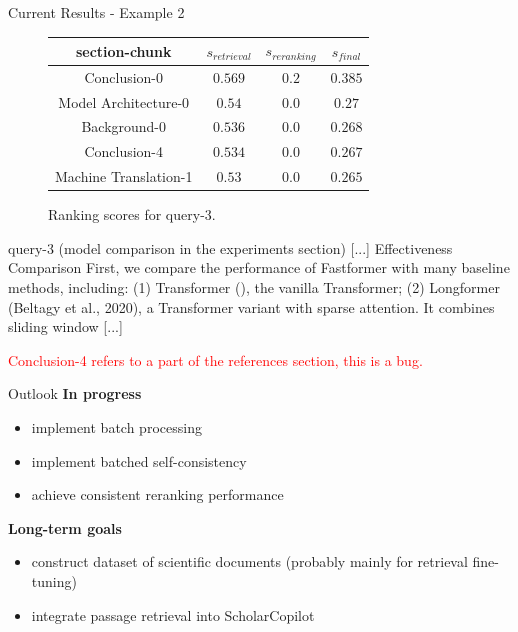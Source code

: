 \begin{frame}{Current Results - Example 2}
    \begin{figure}
        \centering
        \begin{tabular}{|c|c|c|c|}
            \hline 
            section-chunk & $s_{retrieval}$ & $s_{reranking}$ & $s_{final}$ \\
            \hline 
            Conclusion-0 & $0.569$ & $0.2$ & $0.385$ \\
            \hline 
            Model Architecture-0 & $0.54$ & $0.0$ & $0.27$ \\
            \hline 
            Background-0 & $0.536$ & $0.0$ & $0.268$ \\
            \hline 
            Conclusion-4 & $0.534$ & $0.0$ & $0.267$ \\
            \hline 
            Machine Translation-1 & $0.53$ & $0.0$ & $0.265$ \\
            \hline 
        \end{tabular}
        \caption{Ranking scores for query-3.}
    \end{figure}
    \begin{block}{query-3 (model comparison in the experiments section)}
        \small
        [...] Effectiveness Comparison First, we compare the performance of Fastformer with many baseline methods, including: (1) Transformer (), the vanilla Transformer; (2) Longformer (Beltagy et al., 2020), a Transformer variant with sparse attention. It combines sliding window [...]
    \end{block}
    \textcolor{red}{Conclusion-4 refers to a part of the references section, this is a bug.}
\end{frame}

\begin{frame}{Outlook}
    \textbf{In progress}
    \begin{itemize}
        \item implement batch processing
        \item implement batched self-consistency \cite{korikov2025batchedselfconsistencyimprovesllm}
        \item achieve consistent reranking performance
    \end{itemize}
    \bigskip
    \textbf{Long-term goals}
    \begin{itemize}
        \item construct dataset of scientific documents (probably mainly for retrieval fine-tuning)
        \item integrate passage retrieval into ScholarCopilot \cite{wang2025scholarcopilot}
    \end{itemize}
\end{frame}